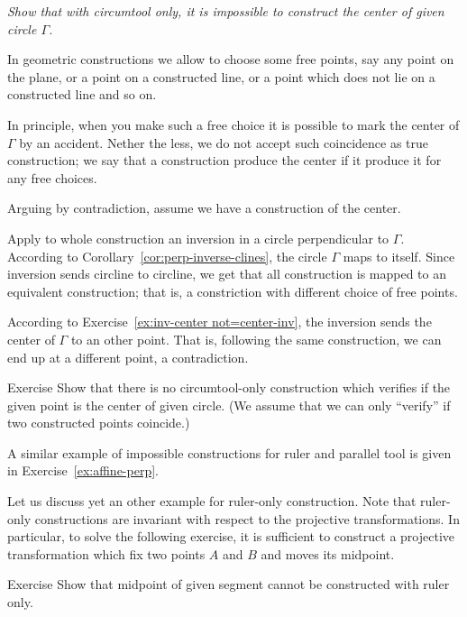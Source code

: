 \textit{Show that with circumtool only,
it is impossible to construct the center of given circle $\Gamma$.}
\medskip

In geometric constructions we allow to choose some free points,
say any point on the plane, or a point on a constructed line, or a point which does not lie on a constructed line and so on.

In principle, when you make such a free choice it is possible to mark the center of $\Gamma$ by an accident.
Nether the less, we do not accept such coincidence as true construction; 
we say that a construction produce the center if it produce it for any free choices.


\label{page:solution-for-ex:circumtool}
Arguing by contradiction, 
assume we have a construction of the center. 

Apply to whole construction an inversion in a circle perpendicular to  $\Gamma$.
According to Corollary~\ref{cor:perp-inverse-clines},
the circle
$\Gamma$ maps to itself.
Since inversion sends circline to circline, we get that all construction is mapped to an equivalent construction; 
that is, a constriction with different choice of free points.

According to Exercise~\ref{ex:inv-center not=center-inv}, 
the inversion sends the center of $\Gamma$ to an other point.
That is, following the same construction, we can end up at a different point, a contradiction.
\qeds

\begin{thm}{Exercise}\label{ex:center-verify}
Show that there is no circumtool-only construction which verifies if the given point is the center of given circle.
(We assume that we can only ``verify'' if two constructed points coincide.) 
\end{thm}

A similar example of impossible constructions for ruler and parallel tool
 is given in Exercise~\ref{ex:affine-perp}.
 
Let us discuss yet an other example for ruler-only construction.
Note that ruler-only constructions are invariant with respect to the projective transformations. 
In particular, to solve the following exercise, it is sufficient to construct a projective transformation which fix two points $A$ and $B$ and moves its midpoint.

\begin{thm}{Exercise}\label{ex:midpoint-proj}
Show that  midpoint of given segment cannot be constructed with ruler only.
\end{thm}

